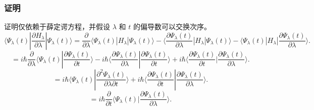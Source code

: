 \subsubsection{证明}
证明仅依赖于薛定谔方程，并假设 \(\lambda\) 和 \(t\) 的偏导数可以交换次序。
\[
\langle \Psi_{\lambda}(t) | \frac{\partial H_{\lambda}}{\partial \lambda} | \Psi_{\lambda}(t) \rangle = \frac{\partial}{\partial \lambda} \langle \Psi_{\lambda}(t) | H_{\lambda} | \Psi_{\lambda}(t) \rangle 
- \langle \frac{\partial \Psi_{\lambda}(t)}{\partial \lambda} | H_{\lambda} | \Psi_{\lambda}(t) \rangle 
- \langle \Psi_{\lambda}(t) | H_{\lambda} | \frac{\partial \Psi_{\lambda}(t)}{\partial \lambda} \rangle.~
\]
\[
= i\hbar \frac{\partial}{\partial \lambda} \langle \Psi_{\lambda}(t) | \frac{\partial \Psi_{\lambda}(t)}{\partial t} \rangle 
- i\hbar \langle \frac{\partial \Psi_{\lambda}(t)}{\partial \lambda} | \frac{\partial \Psi_{\lambda}(t)}{\partial t} \rangle 
+ i\hbar \langle \frac{\partial \Psi_{\lambda}(t)}{\partial t} | \frac{\partial \Psi_{\lambda}(t)}{\partial \lambda} \rangle.~
\]
\[
= i\hbar \langle \Psi_{\lambda}(t) | \frac{\partial^2 \Psi_{\lambda}(t)}{\partial \lambda \partial t} \rangle + i\hbar \langle \frac{\partial \Psi_{\lambda}(t)}{\partial t} | \frac{\partial \Psi_{\lambda}(t)}{\partial \lambda} \rangle.~
\]
\[
= i\hbar \frac{\partial}{\partial t} \langle \Psi_{\lambda}(t) | \frac{\partial \Psi_{\lambda}(t)}{\partial \lambda} \rangle.~
\]
